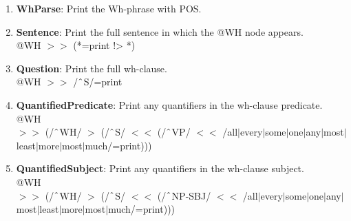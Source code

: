 \begin{enumerate}
    \item \textbf{WhParse}: Print the Wh-phrase with POS.

    \item \textbf{Sentence}: Print the full sentence in which the @WH node appears.\\
    @WH $>\!\!>$ (*=print !> *)

    \item \textbf{Question}: Print the full wh-clause.\\
    @WH $>\!\!>$ /$\string^$S/=print

    \item \textbf{QuantifiedPredicate}: Print any quantifiers in the wh-clause predicate.\\
    @WH \\
    $>\!\!>$ (/$\string^$WH/ $>$ (/$\string^$S/ $<\!\!<$ (/$\string^$VP/ $<\!\!<$ /all$|$every$|$some$|$one$|$any$|$most$|$least$|$more$|$most$|$much/=print)))

    \item \textbf{QuantifiedSubject}: Print any quantifiers in the wh-clause subject.\\
    @WH \\
    $>\!\!>$ (/$\string^$WH/ $>$ (/$\string^$S/ $<\!\!<$ (/$\string^$NP-SBJ/ $<\!\!<$ /all$|$every$|$some$|$one$|$any$|$most$|$least$|$more$|$most$|$much/=print)))

\end{enumerate}




